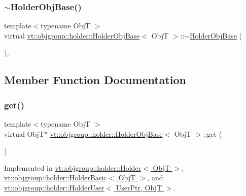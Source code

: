 \subsubsection{\texorpdfstring{$\sim$\+Holder\+Obj\+Base()}{~HolderObjBase()}}
{\footnotesize\ttfamily template$<$typename ObjT $>$ \\
virtual \hyperlink{structvt_1_1objgroup_1_1holder_1_1_holder_obj_base}{vt\+::objgroup\+::holder\+::\+Holder\+Obj\+Base}$<$ ObjT $>$\+::$\sim$\hyperlink{structvt_1_1objgroup_1_1holder_1_1_holder_obj_base}{Holder\+Obj\+Base} (\begin{DoxyParamCaption}{ }\end{DoxyParamCaption})\hspace{0.3cm}{\ttfamily [virtual]}, {\ttfamily [default]}}



\subsection{Member Function Documentation}
\mbox{\label{structvt_1_1objgroup_1_1holder_1_1_holder_obj_base_a4b350b0126259d31a62fd426a08f6698}} 
\subsubsection{\texorpdfstring{get()}{get()}}
{\footnotesize\ttfamily template$<$typename ObjT $>$ \\
virtual ObjT$\ast$ \hyperlink{structvt_1_1objgroup_1_1holder_1_1_holder_obj_base}{vt\+::objgroup\+::holder\+::\+Holder\+Obj\+Base}$<$ ObjT $>$\+::get (\begin{DoxyParamCaption}{ }\end{DoxyParamCaption})\hspace{0.3cm}{\ttfamily [pure virtual]}}



Implemented in \hyperlink{structvt_1_1objgroup_1_1holder_1_1_holder_afa4ab0b8ce4108ad94f602772697c25d}{vt\+::objgroup\+::holder\+::\+Holder$<$ Obj\+T $>$}, \hyperlink{structvt_1_1objgroup_1_1holder_1_1_holder_basic_af1d605b64e5f9d77d4b291c402133f3f}{vt\+::objgroup\+::holder\+::\+Holder\+Basic$<$ Obj\+T $>$}, and \hyperlink{structvt_1_1objgroup_1_1holder_1_1_holder_user_a102b494316b9f906a02f1c47b797e339}{vt\+::objgroup\+::holder\+::\+Holder\+User$<$ User\+Ptr, Obj\+T $>$}.

